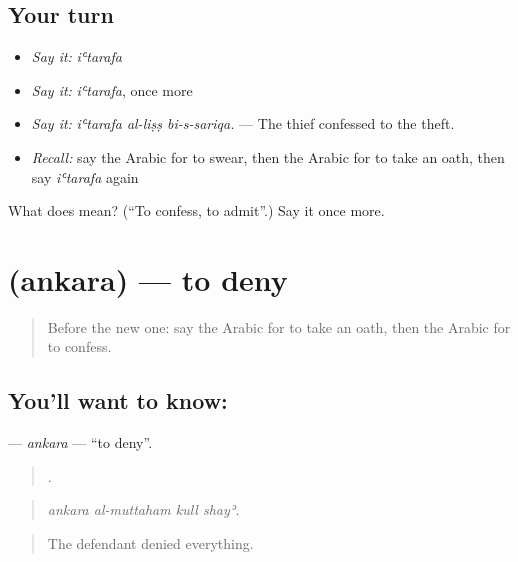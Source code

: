 \subsection*{Your turn}
\begin{itemize}
\raggedright
  \item \emph{Say it:} \emph{iʿtarafa}
  \item \emph{Say it:} \emph{iʿtarafa}, once more
  \item \emph{Say it:} \emph{iʿtarafa al-liṣṣ bi-s-sariqa.} — The thief confessed to the theft.
  \item \emph{Recall:} say the Arabic for to swear, then the Arabic for to take an oath, then say \emph{iʿtarafa} again
\end{itemize}

\begin{tcolorbox}[breakable,colback=teal!4,colframe=teal!35!black,title={Before you move on}]
What does  mean? (\textquotedblleft{}To confess, to admit\textquotedblright{}.) Say it once more.
\end{tcolorbox}
\section[\texorpdfstring{\ar{أنكر} (ankara)}{أنكر (ankara)}]{ (ankara) — to deny}

\label{lesson:AR-C325-ankara}



\begin{quote}
Before the new one: say the Arabic for to take an oath, then the Arabic for to confess.
\end{quote}

\subsection*{You'll want to know: }
\textbf{} — \emph{ankara} — \textquotedblleft{}to deny\textquotedblright{}.

\begin{quote}
   .
\end{quote}

\begin{quote}
\emph{ankara al-muttaham kull shayʾ.}
\end{quote}

\begin{quote}
The defendant denied everything.
\end{quote}

